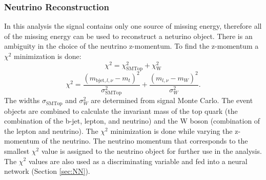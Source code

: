 \subsubsection{Neutrino Reconstruction}
In this analysis the signal contains only one source of missing energy, therefore all of the missing energy can be used to reconstruct a neturino object.  There is an ambiguity in the choice of the neutrino z-momentum.  To find the z-momentum a $\chi^2$ minimization is done:
\[ \chi^2 = \chi_{\text{SMTop}}^2 + \chi_{\text{W}}^2 \]
\[ \chi^2 = \frac{(m_{\text{bjet},l,\nu}-m_t)^2}{\sigma_{\text{SMTop}}^2} + \frac{(m_{l,\nu}-m_W)^2}{\sigma_W^2}. \]
The widths $\sigma_{\text{SMTop}}$ and $\sigma_W^2$ are determined from signal Monte Carlo.  The event objects are combined to calculate the invariant mass of the top quark (the combination of the b-jet, lepton, and neutrino) and the W boson (combination of the lepton and neutrino).  The $\chi^2$ minimization is done while varying the z-momentum of the neutrino.  The neutrino momentum that corresponds to the smallest $\chi^2$ value is assigned to the neutrino object for further use in the analysis.  The $\chi^2$ values are also used as a discriminating variable and fed into a neural network (Section \ref{sec:NN}).







